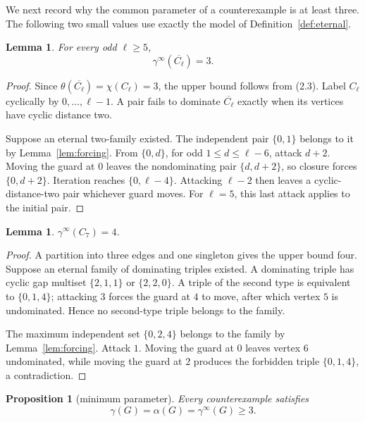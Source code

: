 \documentclass[11pt]{article}
\newtheorem{lemma}[theorem]{Lemma}
\newtheorem{proposition}[theorem]{Proposition}
\theoremstyle{definition}
\theoremstyle{remark}
\newcommand{\gaminf}{\gamma^{\infty}}
\begin{document}
We next record why the common parameter of a counterexample is at least
three.  The following two small values use exactly the model of
Definition~\ref{def:eternal}.

\begin{lemma}\label{lem:odd-antihole}
For every odd \(\ell\geq5\),
\[
  \gaminf(\overline{C_\ell})=3.
\tag{2.6}
\]
\end{lemma}

\begin{proof}
Since \(\theta(\overline{C_\ell})=\chi(C_\ell)=3\), the upper bound follows
from (2.3).  Label \(C_\ell\) cyclically by \(0,\ldots,\ell-1\).
A pair fails to dominate \(\overline{C_\ell}\) exactly when its vertices
have cyclic distance two.

Suppose an eternal two-family existed.  The independent pair \(\{0,1\}\)
belongs to it by Lemma~\ref{lem:forcing}.  From \(\{0,d\}\), for odd
\(1\leq d\leq\ell-6\), attack \(d+2\).  Moving the guard at \(0\) leaves
the nondominating pair \(\{d,d+2\}\), so closure forces
\(\{0,d+2\}\).  Iteration reaches \(\{0,\ell-4\}\).  Attacking
\(\ell-2\) then leaves a cyclic-distance-two pair whichever guard moves.
For \(\ell=5\), this last attack applies to the initial pair.
\end{proof}

\begin{lemma}\label{lem:c7}
\(\gaminf(C_7)=4\).
\end{lemma}

\begin{proof}
A partition into three edges and one singleton gives the upper bound four.
Suppose an eternal family of dominating triples existed.  A dominating
triple has cyclic gap multiset \(\{2,1,1\}\) or \(\{2,2,0\}\).  A triple of
the second type is equivalent to \(\{0,1,4\}\); attacking \(3\) forces the
guard at \(4\) to move, after which vertex \(5\) is undominated.  Hence no
second-type triple belongs to the family.

The maximum independent set \(\{0,2,4\}\) belongs to the family by
Lemma~\ref{lem:forcing}.  Attack \(1\).  Moving the guard at \(0\) leaves
vertex \(6\) undominated, while moving the guard at \(2\) produces the
forbidden triple \(\{0,1,4\}\), a contradiction.
\end{proof}

\begin{proposition}[minimum parameter]\label{prop:min-k}
Every counterexample satisfies
\[
  \gamma(G)=\alpha(G)=\gaminf(G)\geq3.
\tag{2.7}
\]
\end{proposition}
\end{document}
